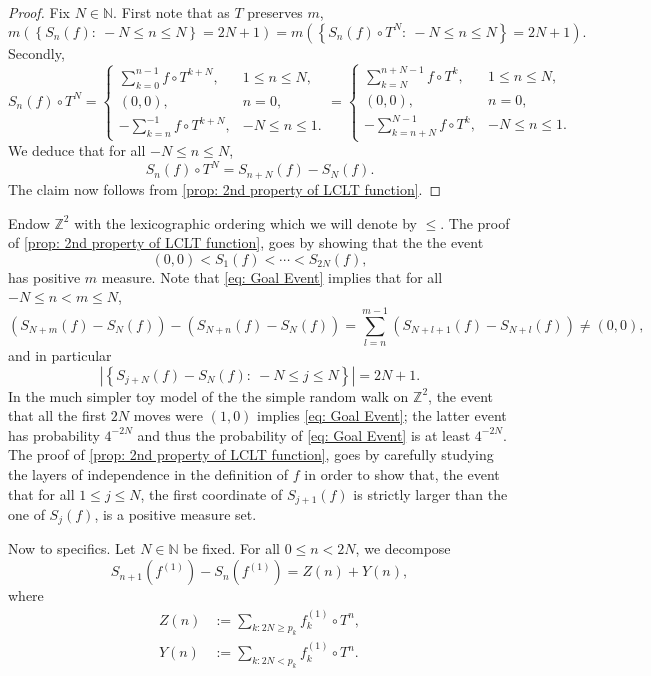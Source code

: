 \documentclass[12pt,reqno]{amsart}
\newcommand{\N}{\mathbb{N}}
\newcommand{\Z}{\mathbb{Z}}
\theoremstyle{definition}
\begin{document}
\begin{proof}
Fix $N\in\N$. First note that as $T$ preserves $m$, 
\[
m\left(\left\{S_n(f):\ -N\leq n\leq N\right\}=2N+1\right)=m\left(\left\{S_n(f)\circ T^N:\ -N\leq n\leq N\right\}=2N+1\right).
\]
Secondly, 
\[
S_n(f)\circ T^N=\begin{cases}
\sum_{k=0}^{n-1}f\circ T^{k+N},& 1\leq n\leq N,\\
(0,0), &n=0,\\
-\sum_{k=n}^{-1}f\circ T^{k+N},& -N\leq n\leq 1.
\end{cases}=\begin{cases}
\sum_{k=N}^{n+N-1}f\circ T^k,& 1\leq n\leq N,\\
(0,0), &n=0,\\
-\sum_{k=n+N}^{N-1}f\circ T^k,& -N\leq n\leq 1.
\end{cases}
\]
We deduce that for all $-N\leq n\leq N$,
\[
S_n(f)\circ T^N=S_{n+N}(f)-S_N(f).
\]
The claim now follows from \cref{prop: 2nd property of LCLT function}. 
\end{proof}
Endow $\Z^2$  with the lexicographic ordering which we will denote by $\leq$. The proof of \cref{prop: 2nd property of LCLT function}, goes by showing that the the event 
\begin{equation}\label{eq: Goal Event}
(0,0)<S_1(f)<\cdots<S_{2N}(f),
\end{equation}
has positive $m$ measure. Note that \eqref{eq: Goal Event} implies that for all $-N\leq n<m\leq N$,
\[
\left(S_{N+m}(f)-S_N(f)\right)-\left(S_{N+n}(f)-S_N(f)\right)=\sum_{l=n}^{m-1}\left(S_{N+l+1}(f)-S_{N+l}(f)\right)\neq (0,0),
\]
and in particular 
\[
\left|\left\{S_{j+N}(f)-S_N(f):\ -N\leq j\leq N\right\}\right|=2N+1.
\]
In the much simpler toy model of the  the simple random walk on $\Z^2$, the event that all the first $2N$ moves were $(1,0)$ implies \eqref{eq: Goal Event}; the latter event has probability $4^{-2N}$ and thus the probability of \eqref{eq: Goal Event} is at least $4^{-2N}$. The proof of \cref{prop: 2nd property of LCLT function}, goes by carefully studying the layers of independence in the definition of $f$ in order to show that, the event that for all $1\leq j\leq N$, the first coordinate of $S_{j+1}(f)$ is strictly larger than the one of $S_j(f)$, is a positive measure set.  


Now to specifics. Let $N\in\N$ be fixed. For all $0\leq n<2N$, we decompose $$S_{n+1}\left(f^{(1)}\right)-S_{n}\left(f^{(1)}\right)=Z(n)+Y(n),$$ where 
\begin{align*}
Z(n)&:=\sum_{k: 2N\geq p_k}f_k^{(1)}\circ T^n,\\
Y(n)&:=\sum_{k: 2N<p_k} f_k^{(1)}\circ T^n.
\end{align*}
\end{document}
